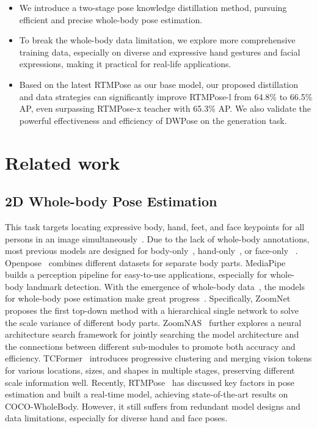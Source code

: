 \documentclass[10pt,twocolumn,letterpaper]{article}
\begin{document}
\begin{itemize}
  \item We introduce a two-stage pose knowledge distillation method, pursuing efficient and precise whole-body pose estimation. 
  
  \item To break the whole-body data limitation, we explore more comprehensive training data, especially on diverse and expressive hand gestures and facial expressions, making it practical for real-life applications.
  \item Based on the latest RTMPose as our base model, our proposed distillation and data strategies can significantly improve RTMPose-l from 64.8\% to 66.5\% AP, even surpassing RTMPose-x teacher with 65.3\% AP. We also validate the powerful effectiveness and efficiency of DWPose on the generation task. 

\end{itemize}

\section{Related work}
\subsection{2D Whole-body Pose Estimation}
This task targets locating expressive body, hand, feet, and face keypoints for all persons in an image simultaneously~\cite{cao2021openpose,hidalgo2019single,jin2020whole}. Due to the lack of whole-body annotations, most previous models are designed for body-only~\cite{li2022simcc,sun2019deep,xiao2018simple,yang2022explicit}, hand-only~\cite{doosti2019hand,moon2020interhand2,zhang2020mediapipe,zimmermann2019freihand}, or face-only~
\cite{li2022towards,wu2019facial,zhu2021improving}. Openpose~\cite{cao2017realtime} combines different datasets for separate body parts. MediaPipe~\cite{lugaresi2019mediapipe,zhang2020mediapipe} builds a perception pipeline for easy-to-use applications, especially for whole-body landmark detection.
With the emergence of whole-body data~\cite{fang2022alphapose,jin2020whole}, the models for whole-body pose estimation make great progress~\cite{hidalgo2019single,jiang2023rtmpose,xu2022zoomnas}. 
Specifically, ZoomNet~\cite{jin2020whole} proposes the first top-down method with a hierarchical single network to solve the scale variance of different body parts. ZoomNAS~\cite{xu2022zoomnas} further explores a neural architecture search framework for jointly searching the model architecture and the connections between different sub-modules to promote both accuracy and efficiency. TCFormer~\cite{zeng2022not} introduces progressive clustering and merging vision tokens for various locations, sizes, and shapes in multiple stages, preserving different scale information well. Recently, RTMPose~\cite{jiang2023rtmpose} has discussed key factors in pose estimation and built a real-time model, achieving state-of-the-art results on COCO-WholeBody. However, it still suffers from redundant model designs and data limitations, especially for diverse hand and face poses.
\end{document}
